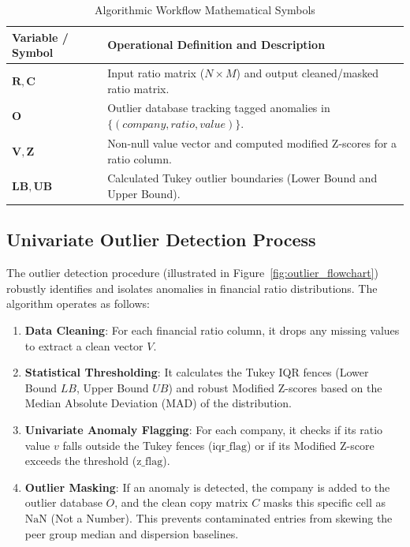 \begin{table}[H]
    \centering
    \renewcommand{\arraystretch}{0.85}
    \caption{Algorithmic Workflow Mathematical Symbols}
    \label{tab:glossary_pseudocode}
    \footnotesize
    \begin{tabularx}{\textwidth}{lX}
        \toprule
        \textbf{Variable / Symbol} & \textbf{Operational Definition and Description} \\
        \midrule
        $\mathbf{R}, \mathbf{C}$ & Input ratio matrix ($N \times M$) and output cleaned/masked ratio matrix. \\
        $\mathbf{O}$ & Outlier database tracking tagged anomalies in $\{(company, ratio, value)\}$. \\
        $\mathbf{V}, \mathbf{Z}$ & Non-null value vector and computed modified Z-scores for a ratio column. \\
        $\mathbf{LB}, \mathbf{UB}$ & Calculated Tukey outlier boundaries (Lower Bound and Upper Bound). \\
        \bottomrule
    \end{tabularx}
\end{table}

\subsection{Univariate Outlier Detection Process}
The outlier detection procedure (illustrated in Figure~\ref{fig:outlier_flowchart}) robustly identifies and isolates anomalies in financial ratio distributions. 
The algorithm operates as follows:
\begin{enumerate}
    \item \textbf{Data Cleaning}: For each financial ratio column, it drops any missing values to extract a clean vector $V$.
    \item \textbf{Statistical Thresholding}: It calculates the Tukey IQR fences (Lower Bound $LB$, Upper Bound $UB$) and robust Modified Z-scores based on the Median Absolute Deviation (MAD) of the distribution.
    \item \textbf{Univariate Anomaly Flagging}: For each company, it checks if its ratio value $v$ falls outside the Tukey fences ($\text{iqr\_flag}$) or if its Modified Z-score exceeds the threshold ($\text{z\_flag}$).
    \item \textbf{Outlier Masking}: If an anomaly is detected, the company is added to the outlier database $O$, and the clean copy matrix $C$ masks this specific cell as $\text{NaN}$ (Not a Number). This prevents contaminated entries from skewing the peer group median and dispersion baselines.
\end{enumerate}

